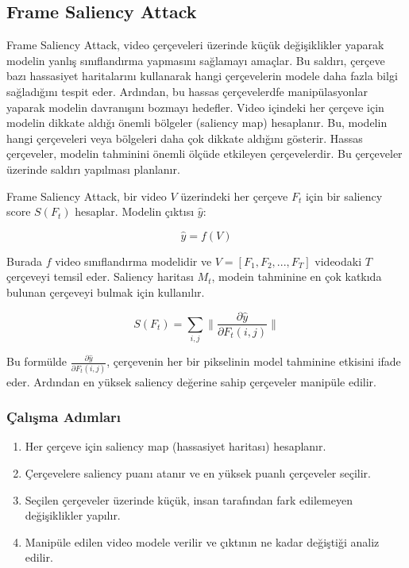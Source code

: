 \newpage

\subsection{Frame Saliency Attack}

Frame Saliency Attack, video çerçeveleri üzerinde küçük değişiklikler yaparak modelin yanlış sınıflandırma yapmasını sağlamayı amaçlar. Bu saldırı, çerçeve bazı hassasiyet haritalarını kullanarak hangi çerçevelerin modele daha fazla bilgi sağladığını tespit eder. Ardından, bu hassas çerçevelerdfe manipülasyonlar yaparak modelin davranışını bozmayı hedefler. Video içindeki her çerçeve için modelin dikkate aldığı önemli bölgeler (saliency map) hesaplanır. Bu, modelin hangi çerçeveleri veya bölgeleri daha çok dikkate aldığını gösterir. Hassas çerçeveler, modelin tahminini önemli ölçüde etkileyen çerçevelerdir. Bu çerçeveler üzerinde saldırı yapılması planlanır.

Frame Saliency Attack, bir video $V$ üzerindeki her çerçeve $F_t$ için bir saliency score $S(F_t)$ hesaplar. Modelin çıktısı $\hat{y}$:

\[ \hat{y} = f(V) \]

Burada $f$ video sınıflandırma modelidir ve $V = [F_1, F_2, ..., F_T]$ videodaki $T$ çerçeveyi temsil eder. Saliency haritası $M_t$, modein tahminine en çok katkıda bulunan çerçeveyi bulmak için kullanılır.

\[ S(F_t) = \sum_{i,j} \| \frac{\partial \hat{y}}{\partial F_t(i, j)} \| \]

Bu formülde $\frac{\partial \hat{y}}{\partial F_t(i, j)}$, çerçevenin her bir pikselinin model tahminine etkisini ifade eder. Ardından en yüksek saliency değerine sahip çerçeveler manipüle edilir.

\subsubsection{Çalışma Adımları}

\begin{enumerate}
    \item Her çerçeve için saliency map (hassasiyet haritası) hesaplanır. 
    \item Çerçevelere saliency puanı atanır ve en yüksek puanlı çerçeveler seçilir.
    \item Seçilen çerçeveler üzerinde küçük, insan tarafından fark edilemeyen değişiklikler yapılır.
    \item Manipüle edilen video modele verilir ve çıktının ne kadar değiştiği analiz edilir.
\end{enumerate}

